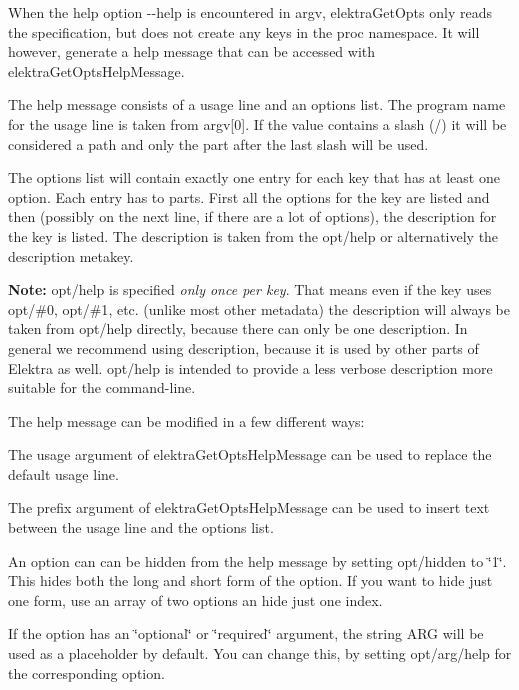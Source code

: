 When the help option {\ttfamily -\/-\/help} is encountered in {\ttfamily argv}, {\ttfamily elektra\+Get\+Opts} only reads the specification, but does not create any keys in the {\ttfamily proc} namespace. It will however, generate a help message that can be accessed with {\ttfamily elektra\+Get\+Opts\+Help\+Message}.

The help message consists of a usage line and an options list. The program name for the usage line is taken from {\ttfamily argv\mbox{[}0\mbox{]}}. If the value contains a slash ({\ttfamily /}) it will be considered a path and only the part after the last slash will be used.

The options list will contain exactly one entry for each key that has at least one option. Each entry has to parts. First all the options for the key are listed and then (possibly on the next line, if there are a lot of options), the description for the key is listed. The description is taken from the {\ttfamily opt/help} or alternatively the {\ttfamily description} metakey.

{\bfseries{Note\+:}} {\ttfamily opt/help} is specified {\itshape only once per key}. That means even if the key uses {\ttfamily opt/\#0}, {\ttfamily opt/\#1}, etc. (unlike most other metadata) the description will always be taken from {\ttfamily opt/help} directly, because there can only be one description. In general we recommend using {\ttfamily description}, because it is used by other parts of Elektra as well. {\ttfamily opt/help} is intended to provide a less verbose description more suitable for the command-\/line.

The help message can be modified in a few different ways\+:


\begin{DoxyItemize}
\item The {\ttfamily usage} argument of {\ttfamily elektra\+Get\+Opts\+Help\+Message} can be used to replace the default usage line.
\item The {\ttfamily prefix} argument of {\ttfamily elektra\+Get\+Opts\+Help\+Message} can be used to insert text between the usage line and the options list.
\item An option can can be hidden from the help message by setting {\ttfamily opt/hidden} to {\ttfamily \char`\"{}1\char`\"{}}. This hides both the long and short form of the option. If you want to hide just one form, use an array of two options an hide just one index.
\item If the option has an {\ttfamily \char`\"{}optional\char`\"{}} or {\ttfamily \char`\"{}required\char`\"{}} argument, the string {\ttfamily A\+RG} will be used as a placeholder by default. You can change this, by setting {\ttfamily opt/arg/help} for the corresponding option.
\end{DoxyItemize}

